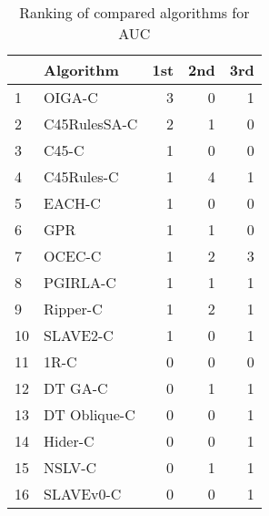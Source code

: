 \begin{table}
\footnotesize
\caption{Ranking of compared algorithms for AUC}
\label{tab:places AUC}
\begin{tabular}{llrrr}
\hline
 & Algorithm & 1st & 2nd & 3rd \\
\hline
1 & OIGA-C & 3 & 0 & 1 \\
2 & C45RulesSA-C & 2 & 1 & 0 \\
3 & C45-C & 1 & 0 & 0 \\
4 & C45Rules-C & 1 & 4 & 1 \\
5 & EACH-C & 1 & 0 & 0 \\
6 & GPR & 1 & 1 & 0 \\
7 & OCEC-C & 1 & 2 & 3 \\
8 & PGIRLA-C & 1 & 1 & 1 \\
9 & Ripper-C & 1 & 2 & 1 \\
10 & SLAVE2-C & 1 & 0 & 1 \\
11 & 1R-C & 0 & 0 & 0 \\
12 & DT GA-C & 0 & 1 & 1 \\
13 & DT Oblique-C & 0 & 0 & 1 \\
14 & Hider-C & 0 & 0 & 1 \\
15 & NSLV-C & 0 & 1 & 1 \\
16 & SLAVEv0-C & 0 & 0 & 1 \\
\hline
\end{tabular}
\end{table}
